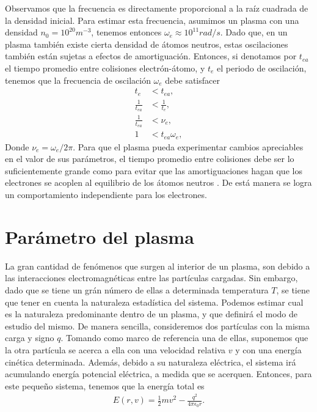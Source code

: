 \documentclass[../main.tex]{subfiles}
\begin{document}
    Observamos que la frecuencia es directamente proporcional a la raíz cuadrada de la densidad inicial. Para estimar esta frecuencia, asumimos
    un plasma con una densidad $n_0 = 10^{20} m^{-3}$, tenemos entonces
    $\omega_e \approx 10^{11} rad/s$. Dado que, en un plasma también existe cierta densidad de átomos neutros, estas oscilaciones también están sujetas a efectos de amortiguación. Entonces, si denotamos por $t_{ea}$ el tiempo promedio entre colisiones electrón-átomo, y $t_e$ el periodo de oscilación, tenemos que la frecuencia de oscilación $\omega_e$ debe satisfacer
    \begin{align}
        t_e &< t_{ea}, \\
        \frac{1}{t_{ea}} &< \frac{1}{t_e}, \\
        \frac{1}{t_{ea}} &< \nu_e,\\
        1 &< t_{ea}\omega_e,
    \end{align}
    Donde $\nu_e = \omega_e / 2\pi$. Para que el plasma pueda experimentar cambios apreciables en el valor de sus parámetros, el tiempo promedio entre colisiones debe ser lo suficientemente grande como para evitar que las amortiguaciones hagan que los electrones se acoplen al equilibrio de los átomos neutros \cite{bittencourt2013fundamentals}. De está manera se logra un comportamiento independiente para los electrones.
    
        
    \section{Parámetro del plasma}
    
    La gran cantidad de fenómenos que surgen al interior de un plasma, son debido a las interacciones electromagnéticas entre las partículas cargadas. Sin embargo, dado que se tiene un grán número de ellas a determinada temperatura $T$, se tiene que tener en cuenta la naturaleza estadística del sistema. Podemos estimar cual es la naturaleza predominante dentro de un plasma, y que definirá el modo de estudio del mismo. De manera sencilla, consideremos dos partículas con la misma carga y signo $q$. Tomando como marco de referencia una de ellas, suponemos que la otra partícula se acerca a ella con una velocidad relativa $v$ y con una energía cinética determinada. Además, debido a su naturaleza eléctrica, el sistema irá acumulando energía potencial eléctrica, a medida que se acerquen. Entonces, para este pequeño sistema, tenemos que la energía total es
\begin{align}
	E(r,v) = \frac{1}{2}mv^2 - \frac{q^2}{4\pi\epsilon_0 r}.
\end{align}
\end{document}
